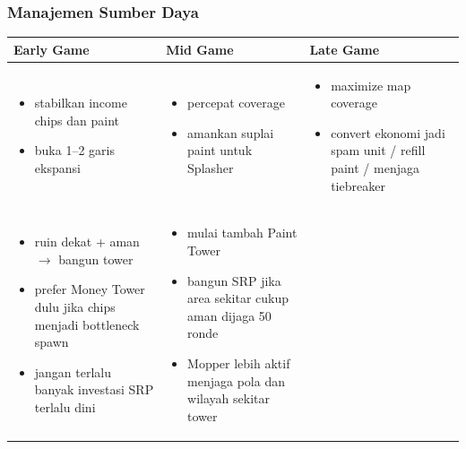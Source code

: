 \documentclass{article}
\begin{document}
\subsubsection{Manajemen Sumber Daya}

\begin{table}[H]
\centering
\begin{tabular}{|p{}|p{}|p{}|}
\hline
\textbf{Early Game} & \textbf{Mid Game} & \textbf{Late Game} \\
\hline

\begin{itemize}[leftmargin=*, nosep]
\item stabilkan income chips dan paint
\item buka 1--2 garis ekspansi
\end{itemize}

&

\begin{itemize}[leftmargin=*, nosep]
\item percepat coverage
\item amankan suplai paint untuk Splasher
\end{itemize}

&

\begin{itemize}[leftmargin=*, nosep]
\item maximize map coverage
\item convert ekonomi jadi spam unit / refill paint / menjaga tiebreaker
\end{itemize}

\\
\hline

\begin{itemize}[leftmargin=*, nosep]
\item ruin dekat + aman $\rightarrow$ bangun tower
\item prefer Money Tower dulu jika chips menjadi bottleneck spawn
\item jangan terlalu banyak investasi SRP terlalu dini
\end{itemize}

&

\begin{itemize}[leftmargin=*, nosep]
\item mulai tambah Paint Tower
\item bangun SRP jika area sekitar cukup aman dijaga 50 ronde
\item Mopper lebih aktif menjaga pola dan wilayah sekitar tower
\end{itemize}


\end{tabular}
\end{table}
\end{document}

